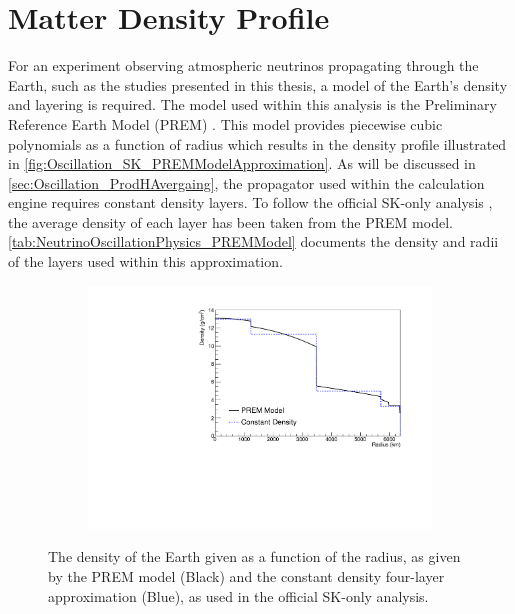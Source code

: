 \section{Matter Density Profile}
\label{sec:Oscillation_MatterDensity}

For an experiment observing atmospheric neutrinos propagating through the Earth, such as the studies presented in this thesis, a model of the Earth's density and layering is required. The model used within this analysis is the Preliminary Reference Earth Model (PREM) \cite{Dziewonski1981-sp}. This model provides piecewise cubic polynomials as a function of radius which results in the density profile illustrated in \autoref{fig:Oscillation_SK_PREMModelApproximation}. As will be discussed in \autoref{sec:Oscillation_ProdHAvergaing}, the propagator used within the calculation engine requires constant density layers. To follow the official SK-only analysis \cite{thesis_roger}, the average density of each layer has been taken from the PREM model. \autoref{tab:NeutrinoOscillationPhysics_PREMModel} documents the density and radii of the layers used within this approximation.

\begin{figure}[h]
  \begin{subfigure}[t]{0.8\textwidth}
    \includegraphics[width=\textwidth, trim={0mm 0mm 0mm 0mm}, clip,page=1]{Figures/Oscillation/DensityComparison.pdf}
  \end{subfigure}
  \caption{The density of the Earth given as a function of the radius, as given by the PREM model (Black) and the constant density four-layer approximation (Blue), as used in the official SK-only analysis.}
  \label{fig:Oscillation_SK_PREMModelApproximation}
\end{figure}

